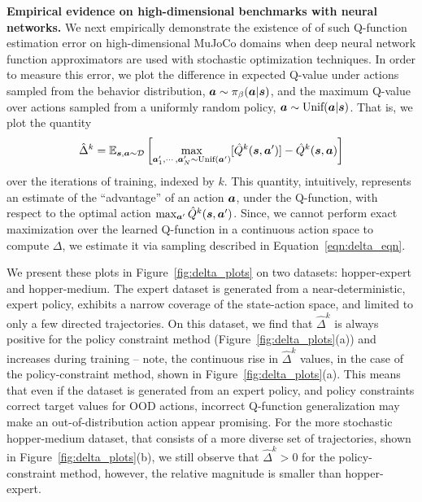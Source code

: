 \textbf{Empirical evidence on high-dimensional benchmarks with neural networks.}  
We next empirically demonstrate the existence of of such Q-function estimation error on high-dimensional MuJoCo domains when deep neural network function approximators are used with stochastic optimization techniques. In order to measure this error, we plot the difference in expected Q-value under actions sampled from the behavior distribution, $\boldsymbol{a} \sim {\pi_\beta}(\boldsymbol{a}|\boldsymbol{s})$, and the maximum Q-value over actions sampled from a uniformly random policy, $\boldsymbol{a} \sim \text{Unif}(\boldsymbol{a}|\boldsymbol{s})$. That is, we plot the quantity
\begin{equation}
\label{eqn:delta_eqn}
    \hat{\Delta}^k = \mathbb{E}_{\boldsymbol{s}, \boldsymbol{a} \sim \mathcal{D}}\left[\max_{\boldsymbol{a}'_1, \cdots, \boldsymbol{a}'_N \sim \text{Unif}(\boldsymbol{a}')}[\hat{Q}^k(\boldsymbol{s}, \boldsymbol{a}')]- \hat{Q}^k(\boldsymbol{s}, \boldsymbol{a})\right]
\end{equation}
over the iterations of training, indexed by $k$. This quantity, intuitively, represents an estimate of the ``advantage'' of an action $\boldsymbol{a}$, under the Q-function, with respect to the optimal action $\max_{\boldsymbol{a}'} \hat{Q}^k(\boldsymbol{s}, \boldsymbol{a}')$. Since, we cannot perform exact maximization over the learned Q-function in a continuous action space to compute $\Delta$, we estimate it via sampling described in Equation~\ref{eqn:delta_eqn}.

We present these plots in Figure~\ref{fig:delta_plots} on two datasets: hopper-expert and hopper-medium. The expert dataset is generated from a near-deterministic, expert policy, exhibits a narrow coverage of the state-action space, and limited to only a few directed trajectories. On this dataset, we find that $\hat{\Delta}^k$ is always positive for the policy constraint method (Figure~\ref{fig:delta_plots}(a)) and increases during training -- note, the continuous rise in $\hat{\Delta}^k$ values, in the case of the policy-constraint method, shown in Figure~\ref{fig:delta_plots}(a). This means that even if the dataset is generated from an expert policy, and policy constraints correct target values for OOD actions,
incorrect Q-function generalization may make an out-of-distribution action appear promising. For the more stochastic hopper-medium dataset, that consists of a more diverse set of trajectories, shown in Figure~\ref{fig:delta_plots}(b), we still observe that $\hat{\Delta}^k > 0$ for the policy-constraint method, however, the relative magnitude is smaller than hopper-expert.

